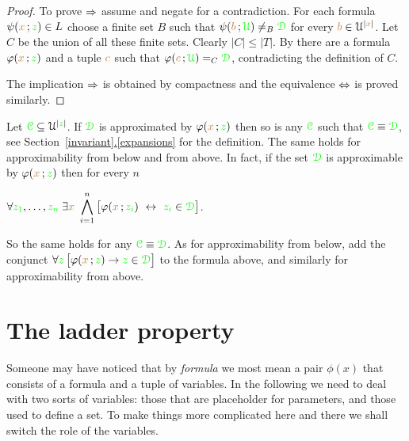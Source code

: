 \documentclass[creche.tex]{subfiles}
\begin{document}
\begin{proof}
To prove $\Rightarrow$ assume  and negate  for a contradiction. For each formula $\psi({\color{brown} x}\,;{\color{green} z})\in L$ choose a finite set $B$ such that $\psi({\color{brown} b}\,;{\color{green}\EuScript U})\neq_B{\color{green}\EuScript D}$ for every ${\color{brown} b}\in\EuScript U^{|{\color{brown} x}|}$. Let $C$ be the union of all these finite sets. Clearly $|C|\le|T|$. By  there are a formula $\varphi({\color{brown} x}\,;{\color{green} z})$ and a tuple ${\color{brown} c}$ such that $\varphi({\color{brown} c}\,;{\color{green}\EuScript U})=_C{\color{green}\EuScript D}$, contradicting the definition of $C$.

The implication $\Rightarrow$ is obtained by compactness and the equivalence $\Leftrightarrow$ is proved similarly. 
\end{proof}



\begin{remark}\label{prop_approx_el_eq}
Let ${\color{green}\EuScript C}\subseteq\EuScript U^{|{\color{green} z}|}$. If ${\color{green}\EuScript D}$ is approximated by $\varphi({\color{brown} x}\,;{\color{green} z})$ then so is any ${\color{green}\EuScript C}$ such that ${\color{green}\EuScript C}\equiv{\color{green}\EuScript D}$, see Section~\hyperref[expansions]{\ref*{invariant}.\ref*{expansions}} for the definition. The same holds for approximability from below and from above. In fact, if the set ${\color{green}\EuScript D}$ is approximable by $\varphi({\color{brown} x}\,;{\color{green} z})$ then for every $n$

\hfil$\displaystyle\A {\gr z_1},\dots,{\gr z_n}\;\E {\mr x}\ \bigwedge^n_{i=1}\big[\phi({\mr x}\,;{\gr z_i})\ \iff\ {\gr z_i}\in{\gr \D}\big]$. 

So the same holds for any ${\color{green}\EuScript C}\equiv{\color{green}\EuScript D}$. As for approximability from below, add the conjunct $\forall {\color{green}z}\,\big[\varphi({\color{brown} x}\,;{\color{green} z})\rightarrow {\color{green}z}\in{\color{green}\EuScript D}\big]$ to the formula above, and similarly for approximability from above.\QED
\end{remark}





\section{The ladder property}

Someone may have noticed that by \textit{formula\/} we most mean a pair $\phi(x)$ that consists of a formula and a tuple of variables. In the following we need to deal with two sorts of variables: those that are placeholder for parameters, and those used to define a set. To make things more complicated here and there we shall switch the role of the variables.
\end{document}
